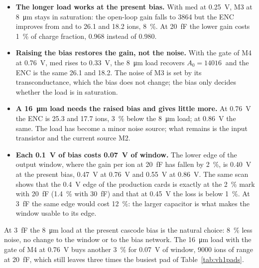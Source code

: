 \documentclass[11pt,a4paper]{article}
\begin{document}
\begin{itemize}
\item \textbf{The longer load works at the present bias.} With
  \textsf{med} at \SI{0.25}{V}, M3 at \SI{8}{\um} stays in saturation: the
  open-loop gain falls to \SI{3864}{} but the ENC improves from
  \vhEncImpFive{} and \vhEncImpFull{} to \SI{26.1}{} and \SI{18.2}{} ions,
  \SI{8}{\percent}. At \SI{20}{fF} the lower gain costs \SI{1}{\percent} of
  charge fraction, \SI{0.968}{} instead of \SI{0.980}{}.
\item \textbf{Raising the bias restores the gain, not the noise.} With the
  gate of M4 at \SI{0.76}{V}, \textsf{med} rises to \SI{0.33}{V}, the
  \SI{8}{\um} load recovers $A_0=\SI{14016}{}$ and the ENC is the same
  \SI{26.1}{} and \SI{18.2}{}. The noise of M3 is set by its
  transconductance, which the bias does not change; the bias only decides
  whether the load is in saturation.
\item \textbf{A \SI{16}{\um} load needs the raised bias and gives little
  more.} At \SI{0.76}{V} the ENC is \SI{25.3}{} and \SI{17.7}{} ions,
  \SI{3}{\percent} below the \SI{8}{\um} load; at \SI{0.86}{V} the same.
  The load has become a minor noise source; what remains is the input
  transistor and the current source M2.
\item \textbf{Each \SI{0.1}{V} of bias costs \SI{0.07}{V} of window.} The
  lower edge of the output window, where the gain per ion at \SI{20}{fF}
  has fallen by \SI{2}{\percent}, is \SI{0.40}{V} at the present bias,
  \SI{0.47}{V} at \SI{0.76}{V} and \SI{0.55}{V} at \SI{0.86}{V}. The same
  scan shows that the \SI{0.4}{V} edge of the production cards is exactly
  at the \SI{2}{\percent} mark with \SI{20}{fF} (\SI{1.4}{\percent} with
  \SI{30}{fF}) and that at \SI{0.45}{V} the loss is below
  \SI{1}{\percent}. At \SI{3}{fF} the same edge would cost
  \SI{12}{\percent}: the larger capacitor is what makes the window usable
  to its edge.
\end{itemize}
%
At \SI{3}{fF} the \SI{8}{\um} load at the present cascode bias is the
natural choice: \SI{8}{\percent} less noise, no change to the window or to
the bias network. The \SI{16}{\um} load with the gate of M4 at \SI{0.76}{V}
buys another \SI{3}{\percent} for \SI{0.07}{V} of window, \SI{9000}{} ions
of range at \SI{20}{fF}, which still leaves three times the busiest pad of
Table~\ref{tab:vh1pads}.
\end{document}
